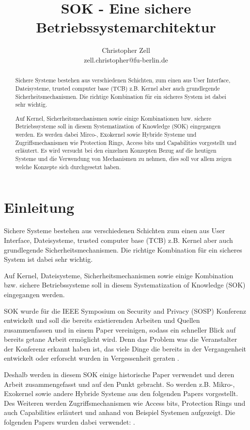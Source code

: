 \documentclass[11pt,technote]{IEEEtran}
\title{SOK - Eine sichere Betriebssystemarchitektur}%
\author{Christopher Zell\\
        zell.christopher@fu-berlin.de}
\begin{document}
\maketitle

  \begin{abstract}
    Sichere Systeme bestehen aus verschiedenen Schichten, zum einen aus User Interface, Dateisysteme, trusted computer base (TCB)
    z.B. Kernel aber auch grundlegende Sicherheitsmechanismen. Die richtige Kombination f\"ur ein sicheres System ist dabei sehr wichtig.
    
    Auf Kernel, Sicherheitsmechanismen sowie einige Kombinationen bzw. sichere Betriebssysteme soll in diesem
    Systematization of Knowledge (SOK) eingegangen werden.
    Es werden dabei Mirco-, Exokernel sowie Hybride Systeme und Zugriffsmechanismen
    wie Protection Rings, Access bits und Capabilities vorgestellt und erl\"autert.
    Es wird versucht bei den einzelnen Konzepten Bezug auf die heutigen Systeme und die Verwendung von Mechanismen zu nehmen,
    dies soll vor allem zeigen welche Konzepte sich durchgesetzt haben.
  \end{abstract}
  
  \section{Einleitung} \label{sec:intro} 
    Sichere Systeme bestehen aus verschiedenen Schichten zum einen aus User Interface, Dateisysteme, trusted computer base (TCB)
    z.B. Kernel aber auch grundlegende Sicherheitsmechanismen. Die richtige Kombination f\"ur ein sicheres System ist dabei sehr wichtig.
    
    Auf Kernel, Dateisysteme, Sicherheitsmechanismen sowie einige Kombination bzw. sichere Betriebssysteme soll in diesem
    Systematization of Knowledge (SOK) eingegangen werden.
    
    SOK wurde f\"ur die IEEE Symposium on Security and Privacy (SOSP) Konferenz
    entwickelt und soll die bereits existierenden Arbeiten und Quellen zusammenfassen
    und in einem Paper vereinigen, sodass ein schneller Blick auf bereits getane
    Arbeit erm\"oglicht wird. Denn das Problem was die Veranstalter der Konferenz
    erkannt haben ist, das viele Dinge die bereits in der Vergangenheit entwickelt oder
    erforscht wurden in Vergessenheit geraten \cite{Url:sok}.
    
    Deshalb werden in diesem SOK einige historische Paper verwendet und deren Arbeit
    zusammengefasst und auf den Punkt gebracht.
    So werden z.B. Mikro-, Exokernel sowie andere Hybride Systeme aus den folgenden Papers 
    \cite{inproc:micro, inproc:exo, inproc:spin, inproc:eros, inproc:asbestos} vorgestellt.
    Des Weiteren werden Zugriffsmechanismen wie Access bits, Protection Rings und auch Capabilities erl\"autert
    und anhand von Beispiel Systemen aufgezeigt. Die folgenden Papers wurden dabei verwendet:
    \cite{inproc:multics, inproc:protec-rings, inproc:unix, inproc:plan9, inproc:cap}.
    
\end{document}
